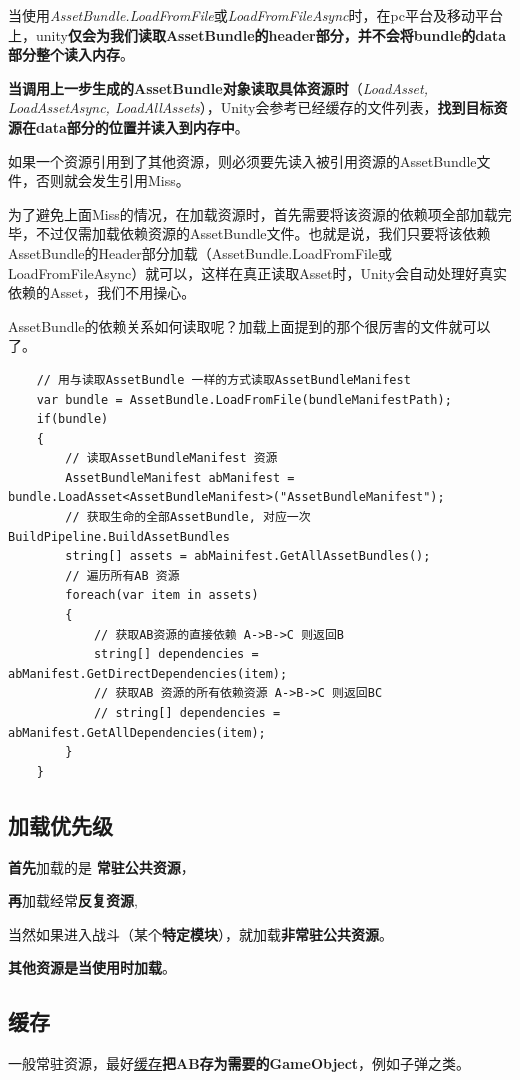 \documentclass[UTF8,a4paper,12pt]{ctexbook}
\begin{document}
			当使用\textit{AssetBundle.LoadFromFile}或\textit{LoadFromFileAsync}时，在pc平台及移动平台上，unity\textbf{仅会为我们读取AssetBundle的header部分，并不会将bundle的data部分整个读入内存}。
			
			\textbf{当调用上一步生成的AssetBundle对象读取具体资源时}（\textit{LoadAsset, LoadAssetAsync, LoadAllAssets}），Unity会参考已经缓存的文件列表，\textbf{找到目标资源在data部分的位置并读入到内存中}。

			如果一个资源引用到了其他资源，则必须要先读入被引用资源的AssetBundle文件，否则就会发生引用Miss。
			
			为了避免上面Miss的情况，在加载资源时，首先需要将该资源的依赖项全部加载完毕，不过仅需加载依赖资源的AssetBundle文件。也就是说，我们只要将该依赖AssetBundle的Header部分加载（AssetBundle.LoadFromFile或LoadFromFileAsync）就可以，这样在真正读取Asset时，Unity会自动处理好真实依赖的Asset，我们不用操心。
			
			AssetBundle的依赖关系如何读取呢？加载上面提到的那个很厉害的文件就可以了。
				\begin{lstlisting}
	// 用与读取AssetBundle 一样的方式读取AssetBundleManifest
	var bundle = AssetBundle.LoadFromFile(bundleManifestPath);
	if(bundle)
	{
		// 读取AssetBundleManifest 资源
		AssetBundleManifest abManifest = bundle.LoadAsset<AssetBundleManifest>("AssetBundleManifest");
		// 获取生命的全部AssetBundle, 对应一次BuildPipeline.BuildAssetBundles
		string[] assets = abMainifest.GetAllAssetBundles();
		// 遍历所有AB 资源
		foreach(var item in assets)
		{
			// 获取AB资源的直接依赖 A->B->C 则返回B
			string[] dependencies = abManifest.GetDirectDependencies(item);
			// 获取AB 资源的所有依赖资源 A->B->C 则返回BC
			// string[] dependencies = abManifest.GetAllDependencies(item);
		}
	}
				\end{lstlisting}
				
				
				
				
		\subsection{加载优先级}		
			\textbf{首先}加载的是 \textbf{常驻公共资源}，
			
			\textbf{再}加载经常\textbf{反复资源},
			
			当然如果进入战斗（某个\textbf{特定模块}），就加载\textbf{非常驻公共资源}。
			
			\textbf{其他资源是当使用时加载}。	

		
		\subsection{缓存}
			一般常驻资源，最好\underline{缓存}\textbf{把AB存为需要的GameObject}，例如子弹之类。
\end{document}
